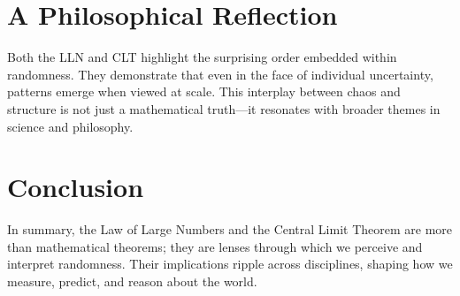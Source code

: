 \section*{A Philosophical Reflection}
Both the LLN and CLT highlight the surprising order embedded within randomness. They demonstrate that even in the face of individual uncertainty, patterns emerge when viewed at scale. This interplay between chaos and structure is not just a mathematical truth---it resonates with broader themes in science and philosophy.

\section*{Conclusion}
In summary, the Law of Large Numbers and the Central Limit Theorem are more than mathematical theorems; they are lenses through which we perceive and interpret randomness. Their implications ripple across disciplines, shaping how we measure, predict, and reason about the world.
